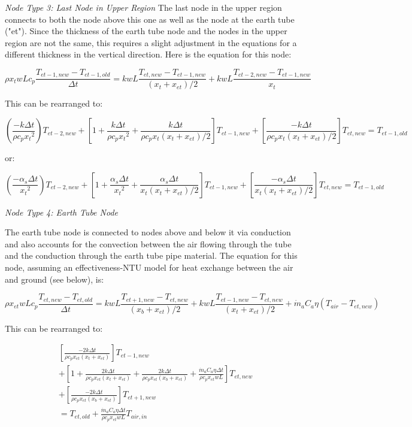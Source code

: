 \emph{\textit{Node Type 3: Last Node in Upper Region}}
The last node in the upper region connects to both the node above this one as well as the node at the earth tube ("et").  Since the thickness of the earth tube node and the nodes in the upper region are not the same, this requires a slight adjustment in the equations for a different thickness in the vertical direction.  Here is the equation for this node:

\begin{equation}
\rho x_t w L c_p \frac{T_{et-1,new} - T_{et-1,old}}{\Delta t} = k w L \frac{T_{et,new}-T_{et-1,new}}{(x_t + x_{et})/2} + k w L \frac{T_{et-2,new}-T_{et-1,new}}{x_t}
\end{equation}

This can be rearranged to:

\begin{equation}
(\frac{-k \Delta t}{\rho c_p {x_t}^2}) T_{et-2,new} + [1 + \frac{k \Delta t}{\rho c_p {x_t}^2} + \frac{k \Delta t}{\rho c_p x_t (x_t+x_{et})/2}] T_{et-1,new} + [\frac{-k \Delta t}{\rho c_p x_t (x_t+x_{et})/2}] T_{et,new} = T_{et-1,old}
\end{equation}

or:

\begin{equation}
(\frac{-\alpha_s \Delta t}{{x_t}^2}) T_{et-2,new} + [1 + \frac{\alpha_s \Delta t}{{x_t}^2} + \frac{\alpha_s \Delta t}{x_t (x_t+x_{et})/2}] T_{et-1,new} + [\frac{-\alpha_s \Delta t}{x_t (x_t+x_{et})/2}] T_{et,new} = T_{et-1,old}
\end{equation}


\emph{\textit{Node Type 4: Earth Tube Node}}

The earth tube node is connected to nodes above and below it via conduction and also accounts for the convection between the air flowing through the tube and the conduction through the earth tube pipe material.  The equation for this node, assuming an effectiveness-NTU model for heat exchange between the air and ground (see below), is:

\begin{equation}
\rho x_{et} w L c_p \frac{T_{et,new} - T_{et,old}}{\Delta t} = k w L \frac{T_{et+1,new}-T_{et,new}}{(x_b + x_{et})/2} + k w L \frac{T_{et-1,new}-T_{et,new}}{(x_t + x_{et})/2} + {\dot m_a}{C_a} \eta (T_{air} - T_{et,new})
\end{equation}

This can be rearranged to:

\begin{equation}
\begin{split}
[ \frac{-2k \Delta t}{\rho c_p x_{et} (x_t + x_{et})} ] T_{et-1,new} \\
 + [ 1 + \frac{2 k \Delta t}{\rho c_p x_{et} (x_t + x_{et})} + \frac{2 k \Delta t}{\rho c_p x_{et} (x_b+x_{et})} + \frac{\dot m_a {C_a} \eta \Delta t}{\rho c_p x_{et} w L} ] T_{et,new} \\
 + [ \frac{-2k \Delta t}{\rho c_p x_{et} (x_b + x_{et})} ] T_{et+1,new} \\
 = T_{et,old} + \frac{\dot m_a {C_a} \eta \Delta t}{\rho c_p x_{et} w L} T_{air,in}
\end{split}
\end{equation}

